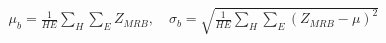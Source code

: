 ﻿\documentclass{article}
\begin{document}
\begin{preview}
\(\displaystyle
\begin{gathered}
  \mu_b
  = \frac{1}{HE}\sum_H\sum_E Z_{MRB}, \quad
  \sigma_b
  = \sqrt{\frac{1}{HE}\sum_H\sum_E (Z_{MRB}-\mu)^2}
\end{gathered}
\)
\end{preview}
\end{document}
